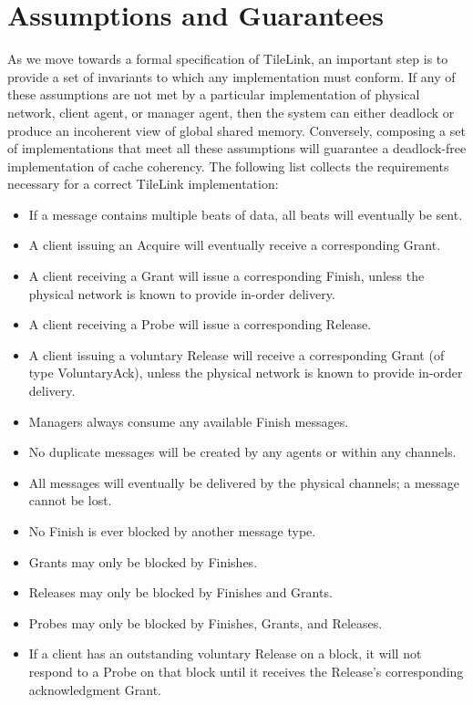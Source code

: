 \section{Assumptions and Guarantees}

As we move towards a formal specification of TileLink, an important step is to provide a set of invariants to which any implementation must conform.
If any of these assumptions are not met by a particular implementation of physical network, client agent,
or manager agent, then the system can either deadlock or produce an incoherent view of global shared memory.
Conversely, composing a set of implementations that meet all these assumptions will
guarantee a deadlock-free implementation of cache coherency.
The following list collects the requirements necessary for a correct TileLink implementation:
\begin{itemize}
\item If a message contains multiple beats of data, all beats will eventually be sent.
\item A client issuing an Acquire will eventually receive a corresponding Grant.
\item A client receiving a Grant will issue a corresponding Finish,
unless the physical network is known to provide in-order delivery.
\item A client receiving a Probe will issue a corresponding Release.
\item A client issuing a voluntary Release will receive a corresponding Grant (of type VoluntaryAck), 
unless the physical network is known to provide in-order delivery.
\item Managers always consume any available Finish messages.
\item No duplicate messages will be created by any agents or within any channels.
\item All messages will eventually be delivered by the physical channels; a message cannot be lost.
\item No Finish is ever blocked by another message type.
\item Grants may only be blocked by Finishes.
\item Releases may only be blocked by Finishes and Grants.
\item Probes may only be blocked by Finishes, Grants, and Releases.
\item If a client has an outstanding voluntary Release on a block, it will not respond to a Probe on that block until it receives the Release's corresponding acknowledgment Grant.

\end{itemize}
